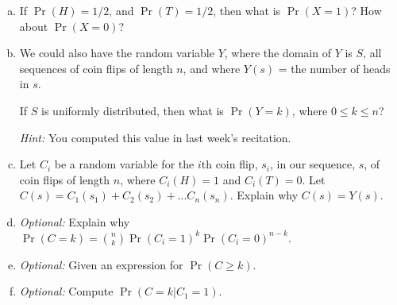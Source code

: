 \documentclass[12pt,letterpaper]{article}
\newenvironment{22enumerate}{\begin{enumerate}[a.]\itemsep0em}{\end{enumerate}}
\begin{document}
\begin{22enumerate}
    \item If $\Pr(H) = 1/2$, and $\Pr(T) = 1/2$, then what is $\Pr(X = 1)$? How about $\Pr(X = 0)$? 

    \begin{mdframed} \vspace{1cm} \end{mdframed}

    \item We could also have the random variable $Y$, where the domain of $Y$ is $S$, all sequences of coin flips of length $n$, and where $Y(s)$ = the number of heads in $s$.  

    If $S$ is uniformly distributed, then what is $\Pr(Y = k)$, where $0 \leq k \leq n$?
    
    \textit{Hint:} You computed this value in last week's recitation.

    \begin{mdframed} \vspace{1cm} \end{mdframed}
    
    \item Let $C_i$ be a random variable for the $i$th coin flip, $s_i$, in our sequence, $s$, of coin flips of length $n$, where $C_i(H) = 1$ and $C_i(T) = 0$. Let $C(s) = C_1(s_1) + C_2(s_2) + ... C_n(s_n)$. Explain why $C(s) = Y(s)$.

    \begin{mdframed} \vspace{1cm} \end{mdframed}

    \item \textit{Optional:} Explain why $\Pr(C = k) = \binom{n}{k}\Pr(C_i = 1)^k \Pr(C_i = 0)^{n - k}$. 

    \begin{mdframed} \vspace{1cm} \end{mdframed}

    \item \textit{Optional:} Given an expression for $\Pr(C \geq k)$. 

    \begin{mdframed} \vspace{1cm} \end{mdframed}

    \item \textit{Optional:} Compute $\Pr(C = k | C_1 = 1)$. 

    \begin{mdframed} \vspace{1cm} \end{mdframed}
    
\end{22enumerate}
\end{document}
